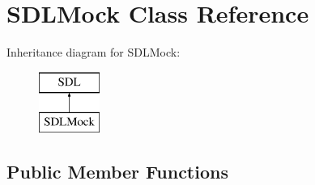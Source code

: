 \hypertarget{classSDLMock}{}\section{S\+D\+L\+Mock Class Reference}
\label{classSDLMock}
Inheritance diagram for S\+D\+L\+Mock\+:\begin{figure}[H]
\begin{center}
\leavevmode
\includegraphics[height=2.000000cm]{classSDLMock}
\end{center}
\end{figure}
\subsection*{Public Member Functions}

